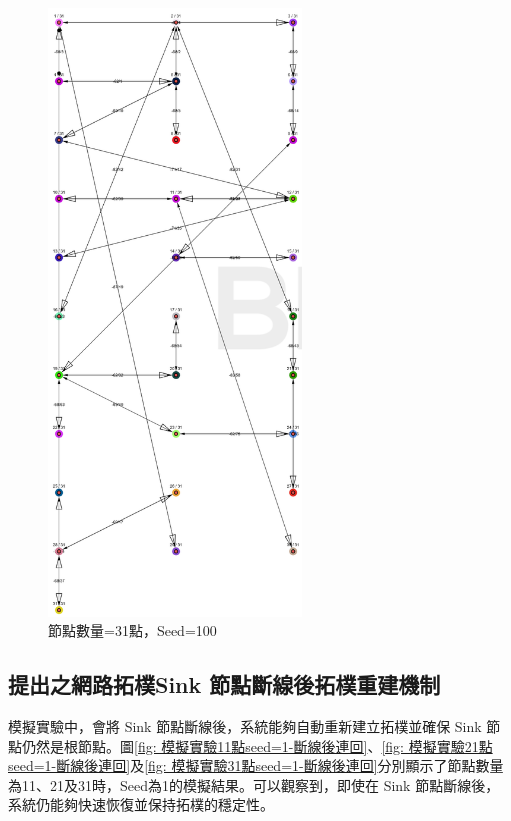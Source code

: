 \begin{ZhChapter}
\begin{figure}[H]
    \centering
    \includegraphics[width = 0.6\textwidth]{image/模擬實驗31點seed=100.png}
    \caption{節點數量=31點，Seed=100}
    \label{fig: 模擬實驗31點seed=100}
\end{figure}

\subsection{提出之網路拓樸Sink 節點斷線後拓樸重建機制}
模擬實驗中，會將 Sink 節點斷線後，系統能夠自動重新建立拓樸並確保 Sink 節點仍然是根節點。圖\ref{fig: 模擬實驗11點seed=1-斷線後連回}、\ref{fig: 模擬實驗21點seed=1-斷線後連回}及\ref{fig: 模擬實驗31點seed=1-斷線後連回}分別顯示了節點數量為11、21及31時，Seed為1的模擬結果。可以觀察到，即使在 Sink 節點斷線後，系統仍能夠快速恢復並保持拓樸的穩定性。

\end{ZhChapter}
